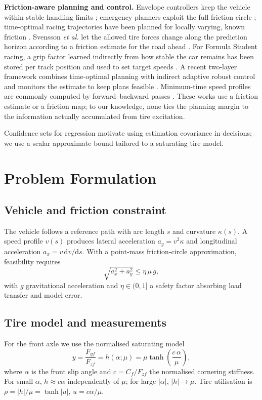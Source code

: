 \documentclass[letterpaper,journal,twoside]{IEEEtran}%
\begin{document}
\textbf{Friction-aware planning and control.} Envelope controllers keep the vehicle within stable handling limits \cite{brown2017}; emergency planners exploit the full friction circle \cite{funke2017}; time-optimal racing trajectories have been planned for locally varying, known friction \cite{christ2021}. Svensson \emph{et al.} let the allowed tire forces change along the prediction horizon according to a friction estimate for the road ahead \cite{svensson2022}. For Formula Student racing, a grip factor learned indirectly from how stable the car remains has been stored per track position and used to set target speeds \cite{bergerhoff2026}. A recent two-layer framework combines time-optimal planning with indirect adaptive robust control and monitors the estimate to keep plans feasible \cite{iarc2026}. Minimum-time speed profiles are commonly computed by forward--backward passes \cite{kapania2016}. These works use a friction estimate or a friction map; to our knowledge, none ties the planning margin to the information actually accumulated from tire excitation.

Confidence sets for regression \cite{abbasi2011} motivate using estimation covariance in decisions; we use a scalar approximate bound tailored to a saturating tire model.



\section{Problem Formulation}
\subsection{Vehicle and friction constraint}
The vehicle follows a reference path with arc length $s$ and curvature $\kappa(s)$. A speed profile $v(s)$ produces lateral acceleration $a_y=v^2\kappa$ and longitudinal acceleration $a_x=v\,\mathrm{d}v/\mathrm{d}s$. With a point-mass friction-circle approximation, feasibility requires
\begin{equation}
\sqrt{a_x^2+a_y^2}\le\eta\,\mu\,g, \label{eq:circle}
\end{equation}
with $g$ gravitational acceleration and $\eta\in(0,1]$ a safety factor absorbing load transfer and model error.

\subsection{Tire model and measurements}
For the front axle we use the normalised saturating model
\begin{equation}
y=\frac{F_{yf}}{F_{zf}}=h(\alpha;\mu)=\mu\tanh\!\left(\frac{c\,\alpha}{\mu}\right), \label{eq:tire}
\end{equation}
where $\alpha$ is the front slip angle and $c=C_f/F_{zf}$ the normalised cornering stiffness. For small $\alpha$, $h\approx c\alpha$ independently of $\mu$; for large $|\alpha|$, $|h|\to\mu$. Tire utilisation is $\rho=|h|/\mu=\tanh|u|$, $u=c\alpha/\mu$.
\end{document}
